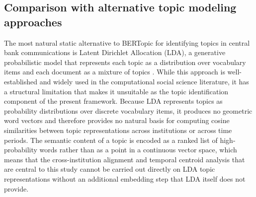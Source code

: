 \subsection{Comparison with alternative topic modeling approaches}\label{subsec:alternatives}

The most natural static alternative to BERTopic for identifying topics in central bank communications is Latent Dirichlet Allocation (LDA), a generative probabilistic model that represents each topic as a distribution over vocabulary items and each document as a mixture of topics \citep{blei_lda_2003}. While this approach is well-established and widely used in the computational social science literature, it has a structural limitation that makes it unsuitable as the topic identification component of the present framework. Because LDA represents topics as probability distributions over discrete vocabulary items, it produces no geometric word vectors and therefore provides no natural basis for computing cosine similarities between topic representations across institutions or across time periods. The semantic content of a topic is encoded as a ranked list of high-probability words rather than as a point in a continuous vector space, which means that the cross-institution alignment and temporal centroid analysis that are central to this study cannot be carried out directly on LDA topic representations without an additional embedding step that LDA itself does not provide.

